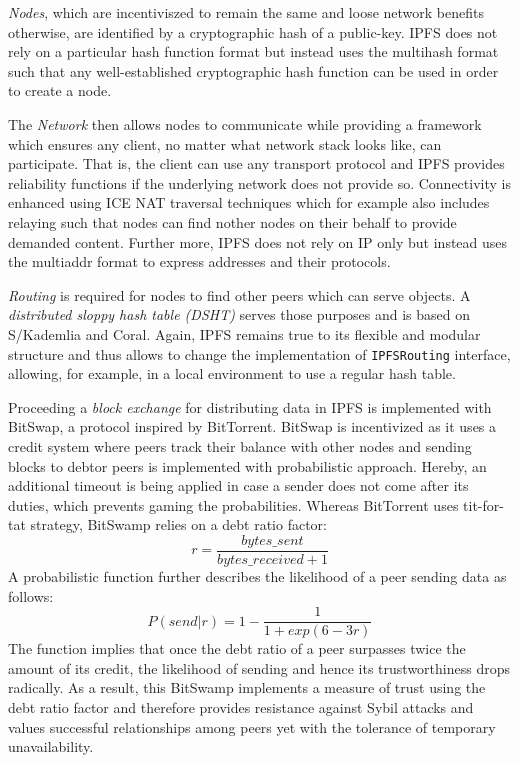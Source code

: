 \documentclass[conference]{IEEEtran}
\begin{document}
\textit{Nodes}, which are incentiviszed to remain the same and loose network benefits otherwise, are identified by a cryptographic hash of a public-key.
IPFS does not rely on a particular hash function format but instead uses the multihash\cite{multihash} format such that any well-established cryptographic hash function can be used in order to create a node.

The \textit{Network} then allows nodes to communicate while providing a framework which ensures any client, no matter what network stack looks like, can participate.
That is, the client can use any transport protocol and IPFS provides reliability functions if the underlying network does not provide so. 
Connectivity is enhanced using ICE NAT traversal techniques \cite{ice-nat} which for example also includes relaying such that nodes can find nother nodes on their behalf to provide demanded content.
Further more, IPFS does not rely on IP only but instead uses the multiaddr\cite{multiaddr} format to express addresses and their protocols.

\textit{Routing} is required for nodes to find other peers which can serve objects.
A \textit{distributed sloppy hash table (DSHT)}\cite{dsht} serves those purposes and is based on S/Kademlia\cite{kademlia} and Coral\cite{coral}. 
Again, IPFS remains true to its flexible and modular structure and thus allows to change the implementation of \texttt{IPFSRouting} interface, allowing, for example, in a local environment to use a regular hash table. \cite{ipfs-whitepaper}

Proceeding a \textit{block exchange} for distributing data in IPFS is implemented with BitSwap\cite{bitswap}, a protocol inspired by BitTorrent\cite{bittorrent}.
BitSwap is incentivized as it uses a credit system where peers track their balance with other nodes and sending blocks to debtor peers is implemented with probabilistic approach.
Hereby, an additional timeout is being applied in case a sender does not come after its duties, which prevents gaming the probabilities.
Whereas BitTorrent uses tit-for-tat strategy, BitSwamp relies on a debt ratio factor: \[r=\frac{bytes\_sent}{bytes\_received+1}\]
A probabilistic function further describes the likelihood of a peer sending data as follows:
\[P(send|r)= 1-\frac{1}{1 + exp(6-3r)}\]
The function implies that once the debt ratio of a peer surpasses twice the amount of its credit, the likelihood of sending and hence its trustworthiness drops radically.
As a result, this BitSwamp implements a measure of trust using the debt ratio factor and therefore provides resistance against Sybil attacks and values successful relationships among peers yet with the tolerance of temporary unavailability. \cite{ipfs-whitepaper}
\end{document}
